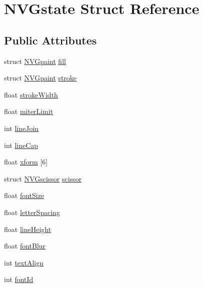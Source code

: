 \hypertarget{struct_n_v_gstate}{\section{N\+V\+Gstate Struct Reference}
\label{struct_n_v_gstate}
}
\subsection*{Public Attributes}
\begin{DoxyCompactItemize}
\item 
struct \hyperlink{struct_n_v_gpaint}{N\+V\+Gpaint} \hyperlink{struct_n_v_gstate_a1360acd78a82e03ea2184b295630572c}{fill}
\item 
struct \hyperlink{struct_n_v_gpaint}{N\+V\+Gpaint} \hyperlink{struct_n_v_gstate_a0423f044a0ef4445270156232c88b340}{stroke}
\item 
float \hyperlink{struct_n_v_gstate_a0266a3e8c86c689a7eba07cf1b8adac2}{stroke\+Width}
\item 
float \hyperlink{struct_n_v_gstate_a274ff13d3a13ed64b17f45eed44ff02a}{miter\+Limit}
\item 
int \hyperlink{struct_n_v_gstate_a5aa107c0177e88030124c63b306b6d01}{line\+Join}
\item 
int \hyperlink{struct_n_v_gstate_ad1767dce784dc325d7e16364ce92c8ec}{line\+Cap}
\item 
float \hyperlink{struct_n_v_gstate_ad59f377ee80c48e3e37e4deb3464e030}{xform} \mbox{[}6\mbox{]}
\item 
struct \hyperlink{struct_n_v_gscissor}{N\+V\+Gscissor} \hyperlink{struct_n_v_gstate_a75bd77e78aa4304e0e019933fd3307ab}{scissor}
\item 
float \hyperlink{struct_n_v_gstate_a58d3ac1b707cbe651244a7bc00a84dc2}{font\+Size}
\item 
float \hyperlink{struct_n_v_gstate_a4c83b231e88c9a45c3c53a1ff4022f02}{letter\+Spacing}
\item 
float \hyperlink{struct_n_v_gstate_a456105152dc65acf8888734de0cb6195}{line\+Height}
\item 
float \hyperlink{struct_n_v_gstate_ad282c241982571cd28296bdc42a3e167}{font\+Blur}
\item 
int \hyperlink{struct_n_v_gstate_a892bf3be3137e966108164c93730ce2b}{text\+Align}
\item 
int \hyperlink{struct_n_v_gstate_a714541c6c402eb466a54610696218215}{font\+Id}
\end{DoxyCompactItemize}



